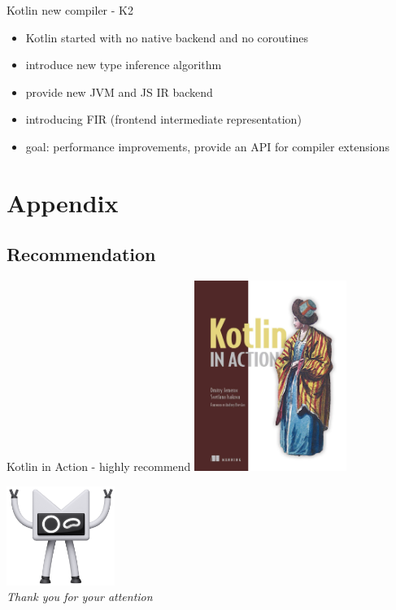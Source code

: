\documentclass[hyperref={pdfpagelabels=false},xcolor={dvipsnames},compress]{beamer}
\begin{document}
    \begin{frame}{Kotlin new compiler - K2}
        \begin{itemize}
            \item Kotlin started with no native backend and no coroutines \pause
            \item introduce new type inference algorithm \pause
            \item provide new JVM and JS IR backend \pause
            \item introducing FIR (frontend intermediate representation) \pause
            \item goal: performance improvements, provide an API for compiler extensions
        \end{itemize}
    \end{frame}

    \section*{Appendix}
    \subsection*{Recommendation}

    \begin{frame}{Kotlin in Action - highly recommend}
        \centering
        \includegraphics[width=140pt]{images/action.png}
    \end{frame}

    {
        \begin{frame}{}
            \centering
            \includegraphics[width=100pt]{images/blink.png}\\\vspace{1cm}
            \emph{\Large Thank you for your attention}
        \end{frame}
    }
\end{document}
